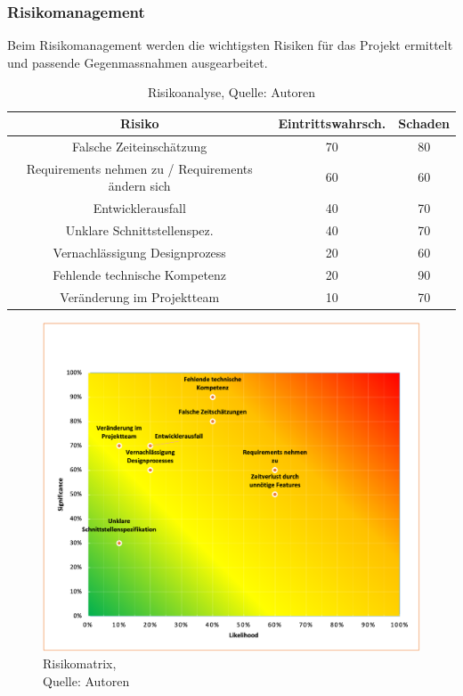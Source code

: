 \subsubsection{Risikomanagement}\label{risikomanagement}
Beim Risikomanagement werden die wichtigsten Risiken für das Projekt ermittelt und passende Gegenmassnahmen ausgearbeitet. 

\begin{table}[H]
\setlength\extrarowheight{2pt} %
\begin{tabularx}{\textwidth}{|C|C|C|}
\hline
\textbf{Risiko} & \textbf{Eintrittswahrsch.} & \textbf{Schaden} \\

\hline
Falsche Zeiteinschätzung &  70 & 80\\
\hline
Requirements nehmen zu / Requirements ändern sich & 60 & 60\\
\hline
Entwicklerausfall & 40 & 70\\
\hline
Unklare Schnittstellenspez. & 40 & 70\\
\hline
Vernachlässigung Designprozess & 20 & 60\\
\hline
Fehlende technische Kompetenz & 20 & 90\\
\hline
Veränderung im Projektteam & 10 & 70\\
\hline
\end{tabularx}
\caption{ \label{tbl: Risikoanalyse}Risikoanalyse, Quelle: Autoren}
\end{table}
\begin{figure}[H]
    \centering
    \includegraphics[width=1\textwidth]{images/RiskMap.png}
    \caption[Risikomatrix]{Risikomatrix,\\ Quelle: Autoren}
    \label{img: Risikomatrix}
\end{figure}

